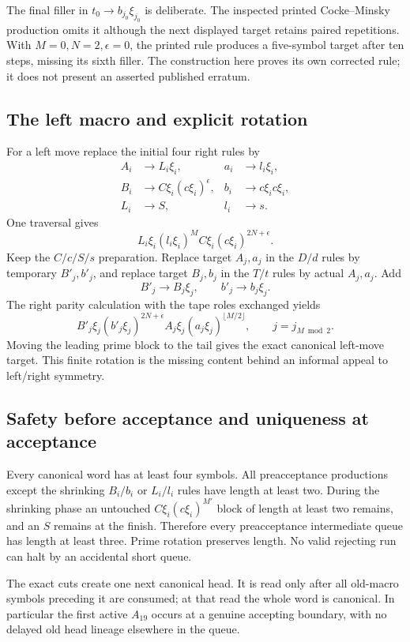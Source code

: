 \documentclass[11pt,letterpaper]{article}
\theoremstyle{definition}\newtheorem{definition}[theorem]{Definition}
\theoremstyle{remark}\newtheorem{remark}[theorem]{Remark}
\begin{document}
The final filler in $t_0\to b_{j_0}\xi_{j_0}$ is deliberate. The inspected printed Cocke--Minsky production omits it although the next displayed target retains paired repetitions. With $M=0,N=2,\epsilon=0$, the printed rule produces a five-symbol target after ten steps, missing its sixth filler. The construction here proves its own corrected rule; it does not present an asserted published erratum.

\subsection{The left macro and explicit rotation}
For a left move replace the initial four right rules by
\begin{align*}
 A_i&\to L_i\xi_i,& a_i&\to l_i\xi_i,\\
 B_i&\to C\xi_i(c\xi_i)^\epsilon,&b_i&\to c\xi_i c\xi_i,\\
 L_i&\to S,&l_i&\to s.
\end{align*}
One traversal gives
\[
 L_i\xi_i(l_i\xi_i)^M C\xi_i(c\xi_i)^{2N+\epsilon}.
\]
Keep the $C/c/S/s$ preparation. Replace target $A_j,a_j$ in the $D/d$ rules by temporary $B'_j,b'_j$, and replace target $B_j,b_j$ in the $T/t$ rules by actual $A_j,a_j$. Add
\[
 B'_j\to B_j\xi_j,\qquad b'_j\to b_j\xi_j.
\]
The right parity calculation with the tape roles exchanged yields
\[
 B'_j\xi_j(b'_j\xi_j)^{2N+\epsilon}
 A_j\xi_j(a_j\xi_j)^{\lfloor M/2\rfloor},
 \qquad j=j_{M\bmod2}.
\]
Moving the leading prime block to the tail gives the exact canonical left-move target. This finite rotation is the missing content behind an informal appeal to left/right symmetry.

\subsection{Safety before acceptance and uniqueness at acceptance}
Every canonical word has at least four symbols. All preacceptance productions except the shrinking $B_i/b_i$ or $L_i/l_i$ rules have length at least two. During the shrinking phase an untouched $C\xi_i(c\xi_i)^{M'}$ block of length at least two remains, and an $S$ remains at the finish. Therefore every preacceptance intermediate queue has length at least three. Prime rotation preserves length. No valid rejecting run can halt by an accidental short queue.

The exact cuts create one next canonical head. It is read only after all old-macro symbols preceding it are consumed; at that read the whole word is canonical. In particular the first active $A_{19}$ occurs at a genuine accepting boundary, with no delayed old head lineage elsewhere in the queue.
\end{document}
